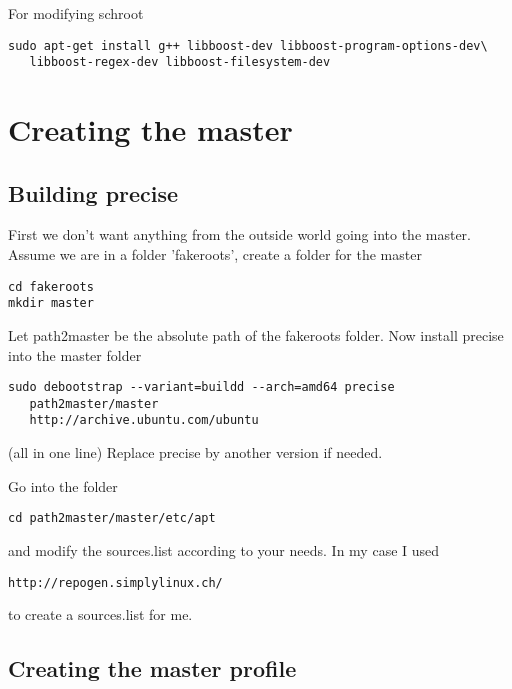 \documentclass[a4paper]{book}
\begin{document}
For modifying schroot

\begin{verbatim}
sudo apt-get install g++ libboost-dev libboost-program-options-dev\
   libboost-regex-dev libboost-filesystem-dev
\end{verbatim}


\section{Creating the master}
\subsection{Building precise}
First we don't want anything from the outside world going into the master.
Assume we are in a folder 'fakeroots', create a folder for the master

\begin{verbatim}
cd fakeroots
mkdir master
\end{verbatim}

Let path2master be the absolute path of the fakeroots folder.
Now install precise into the master folder

\begin{verbatim}
sudo debootstrap --variant=buildd --arch=amd64 precise 
   path2master/master 
   http://archive.ubuntu.com/ubuntu
\end{verbatim}

(all in one line)
Replace precise by another version if needed.

Go into the folder

\begin{verbatim}
cd path2master/master/etc/apt
\end{verbatim}

and modify the sources.list according to your needs. In my case I used

\begin{verbatim}
http://repogen.simplylinux.ch/
\end{verbatim}

to create a sources.list for me.
\subsection{Creating the master profile}
\end{document}
